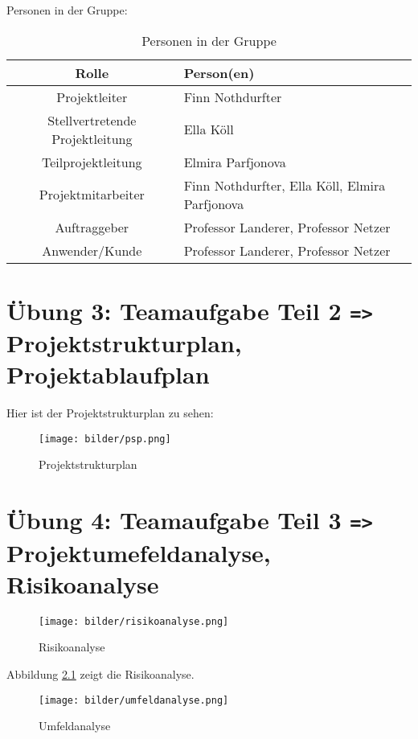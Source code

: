 \documentclass[a4paper,12pt]{report}
\begin{document}
Personen in der Gruppe:

\begin{table}[h]
    \centering
    \begin{tabular}{|c|l|}
        \hline
        \textbf{Rolle} & \textbf{Person(en)} \\
        \hline
        Projektleiter & Finn Nothdurfter \\
        Stellvertretende Projektleitung & Ella Köll \\
        Teilprojektleitung & Elmira Parfjonova \\
        Projektmitarbeiter & Finn Nothdurfter, Ella Köll, Elmira Parfjonova \\
        Auftraggeber & Professor Landerer, Professor Netzer \\
        Anwender/Kunde & Professor Landerer, Professor Netzer \\
        \hline
    \end{tabular}
    \caption{Personen in der Gruppe}
    \label{tab:personen}
\end{table}


    \chapter{Übung 3: Teamaufgabe Teil 2 \texttt{=>} Projektstrukturplan, Projektablaufplan}

    Hier ist der Projektstrukturplan zu sehen:

    \begin{figure}[h]
        \centering
        \texttt{[image: bilder/psp.png]}
        \caption{Projektstrukturplan}
        \label{fig:psp}
    \end{figure}

    \chapter{Übung 4: Teamaufgabe Teil 3 \texttt{=>} Projektumefeldanalyse, Risikoanalyse}

    \begin{figure}[h]
        \centering
        \texttt{[image: bilder/risikoanalyse.png]}
        \caption{Risikoanalyse}
        \label{fig:risikoanalyse}
    \end{figure}

    Abbildung \ref{fig:risikoanalyse} zeigt die Risikoanalyse.
    
    \begin{figure}[h]
        \centering
        \texttt{[image: bilder/umfeldanalyse.png]}
        \caption{Umfeldanalyse}
        \label{fig:umfeldanalyse}
    \end{figure}
\end{document}
